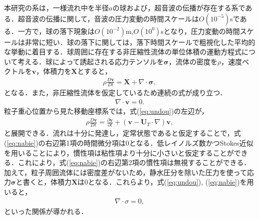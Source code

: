 本研究の系は，一様流れ中を半径$a$の球および，超音波の伝播が存在する系である．超音波の伝播に関して，音波の圧力変動の時間スケールは$O\left(10^{-5}\right)$sである．一方で，球の落下現象は$O\left(10^{-2}\right)$m,$O\left(10^{0}\right)$sとなり，圧力変動の時間スケールは非常に短い．球の落下に関しては，落下時間スケールで粗視化した平均的な挙動に着目する．球周囲に存在する非圧縮性流体の単位体積の運動方程式について考える．球によって誘起される応力テンソルを$\bm{\sigma}$，流体の密度を$\rho$，速度ベクトルを$\bm{v}$，体積力を$\bm{X}$とすると，
\begin{eqnarray}
    \rho \frac{D\bm{v}}{Dt} = \bm{X} + \nabla \cdot \bm{\sigma} ,
    \label{eq:undou}
\end{eqnarray}
となる．また，非圧縮性流体を仮定しているため連続の式が成り立つ．
\begin{eqnarray}
    \nabla \cdot \bm{v} = 0 .
    \label{eq:renzoku}
\end{eqnarray}
粒子重心位置から見た移動座標系では，式(\ref{eq:undou})の左辺が，
\begin{eqnarray}
    \rho \frac{D\bm{v}}{Dt} = \frac{\partial \bm{v}}{\partial t} + \left(\bm{v} - \bm{U}_T \cdot \nabla \right) \bm{v} ,
    \label{eq:nabie}
\end{eqnarray}
と展開できる．流れは十分に発達し，定常状態であると仮定することで，式(\ref{eq:nabie})の右辺第1項の時間微分項は0となる．低レイノルズ数かつStokes近似を用いることにより，慣性項は粘性項より十分に小さいと仮定することができる．これにより，式(\ref{eq:nabie})の右辺第2項の慣性項は無視することができる．加えて，粒子周囲流体には密度差がないため，静水圧分を除いた圧力を使って応力${\bm \sigma}$と書くと，体積力${\bm X}$は0となる．これらより，式(\ref{eq:undou}), (\ref{eq:nabie})を用いると，
\begin{eqnarray}
    \nabla \cdot \sigma = 0 ,
    \label{eq:sigma-}
\end{eqnarray}
といった関係が導かれる．

